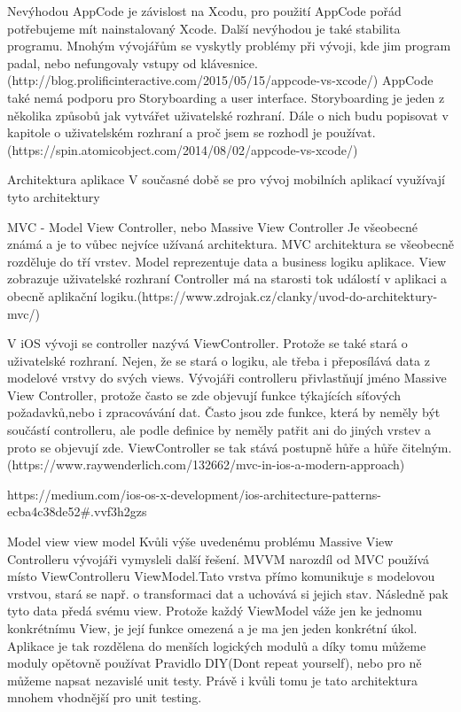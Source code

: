 \documentclass[thesis=B,czech]{FITthesis}[2012/06/26]
\begin{document}
Nevýhodou AppCode je závislost na Xcodu, pro použití AppCode pořád potřebujeme mít nainstalovaný Xcode. Další nevýhodou je také stabilita programu. Mnohým vývojářům se vyskytly problémy při vývoji, kde jim program padal, nebo nefungovaly vstupy od klávesnice.(http://blog.prolificinteractive.com/2015/05/15/appcode-vs-xcode/)
AppCode také nemá podporu pro Storyboarding a user interface. Storyboarding je jeden z několika způsobů jak vytvářet uživatelské rozhraní. Dále o nich budu popisovat v kapitole o uživatelském rozhraní a proč jsem se rozhodl je používat.
(https://spin.atomicobject.com/2014/08/02/appcode-vs-xcode/)

Architektura aplikace
V současné době se pro vývoj mobilních aplikací využívají tyto architektury

MVC - Model View Controller, nebo Massive View Controller
Je všeobecné známá a je to vůbec nejvíce užívaná architektura. MVC architektura se všeobecně rozděluje do tří vrstev.
Model reprezentuje data a business logiku aplikace.
View zobrazuje uživatelské rozhraní
Controller má na starosti tok událostí v aplikaci a obecně aplikační logiku.(https://www.zdrojak.cz/clanky/uvod-do-architektury-mvc/)

V iOS vývoji se controller nazývá ViewController. Protože se také stará o uživatelské rozhraní. Nejen, že se stará o logiku, ale třeba i přeposílává data z modelové vrstvy do svých views. Vývojáři controlleru přivlastňují jméno Massive View Controller, protože často se zde objevují funkce týkajících síťových požadavků,nebo i  zpracovávání dat. Často jsou zde funkce, která by neměly být součástí controlleru, ale podle definice by neměly patřit ani do jiných vrstev a proto se objevují zde. ViewController se tak stává postupně hůře a hůře čitelným.(https://www.raywenderlich.com/132662/mvc-in-ios-a-modern-approach)

https://medium.com/ios-os-x-development/ios-architecture-patterns-ecba4c38de52#.vvf3h2gzs

Model view view model
Kvůli výše uvedenému problému Massive View Controlleru vývojáři vymysleli další řešení. MVVM narozdíl od MVC používá místo ViewControlleru ViewModel.Tato vrstva přímo komunikuje s modelovou vrstvou, stará se např. o transformaci dat a uchovává si jejich stav. Následně pak tyto data předá svému view. Protože každý ViewModel váže jen ke jednomu konkrétnímu View, je její funkce omezená a je ma jen jeden konkrétní úkol. Aplikace je tak rozdělena do menších logických modulů a díky tomu můžeme moduly opětovně používat Pravidlo DIY(Dont repeat yourself), nebo pro ně můžeme napsat nezavislé unit testy. Právě i kvůli tomu je tato architektura mnohem vhodnější pro unit testing.
\end{document}
